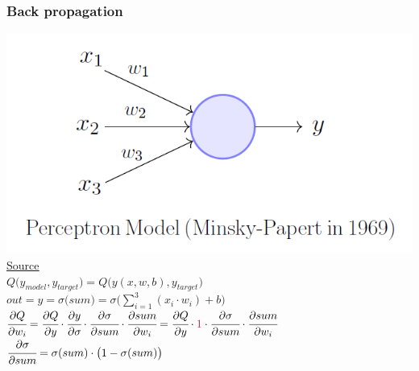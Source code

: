 \documentclass[12pt, aspectratio = 169]{beamer}
\newcommand{\red}{\color{calmRed}}
\newcommand{\black}{\color{black}}
\begin{document}

\begin{frame}
	\frametitle{Back propagation}
	\centering
    \includegraphics[width=0.35\linewidth]{perceptron_model.png}\\
    \href{https://towardsdatascience.com/what-is-a-perceptron-210a50190c3b}{\color{blue}\uline{Source}}\\
    $Q \big(y_{model}, y_{target} \big) = Q \big(y(x, w, b), y_{target} \big)$\\
    $out = y = \sigma \big(sum \big)= \sigma \big(\sum \limits_{i=1}^{3}(x_i \cdot w_i) + b \big)$
    $\cfrac{\partial Q}{\partial w_i} = \cfrac{\partial Q}{\partial y} \cdot \cfrac{\partial y}{\partial \sigma} \cdot \cfrac{\partial \sigma}{\partial sum} \cdot \cfrac{\partial sum}{\partial w_i} = \cfrac{\partial Q}{\partial y} \cdot \red 1 \black \cdot \cfrac{\partial \sigma}{\partial sum} \cdot \cfrac{\partial sum}{\partial w_i}$\\
    $\cfrac{\partial \sigma}{\partial sum} = \sigma (sum) \cdot \big(1 - \sigma (sum) \big)$
\end{frame}

\end{document}
